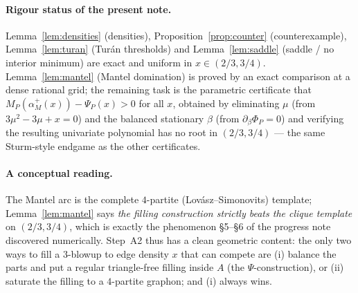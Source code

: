 \documentclass[11pt]{amsart}
\theoremstyle{definition}
\begin{document}
\paragraph{Rigour status of the present note.}
Lemma~\ref{lem:densities} (densities), Proposition~\ref{prop:counter}
(counterexample), Lemma~\ref{lem:turan} (Tur\'an thresholds) and
Lemma~\ref{lem:saddle} (saddle / no interior minimum) are exact and uniform in
$x\in(2/3,3/4)$.  Lemma~\ref{lem:mantel} (Mantel domination) is proved by an
exact comparison at a dense rational grid; the remaining task is the
parametric certificate that $M_P(\alpha_M^{+}(x))-\Psi_P(x)>0$ for all $x$,
obtained by eliminating $\mu$ (from $3\mu^2-3\mu+x=0$) and the balanced
stationary $\beta$ (from $\partial_\beta\Phi_P=0$) and verifying the resulting
univariate polynomial has no root in $(2/3,3/4)$ --- the same Sturm-style
endgame as the other certificates.

\paragraph{A conceptual reading.}
The Mantel arc is the complete $4$-partite (Lov\'asz--Simonovits) template;
Lemma~\ref{lem:mantel} says \emph{the filling construction strictly beats the
clique template} on $(2/3,3/4)$, which is exactly the phenomenon
\S5--\S6 of the progress note discovered numerically.  Step~A2 thus has a
clean geometric content: the only two ways to fill a $3$-blowup to edge
density $x$ that can compete are (i) balance the parts and put a regular
triangle-free filling inside $A$ (the $\Psi$-construction), or (ii) saturate
the filling to a $4$-partite graphon; and (i) always wins.
\end{document}
